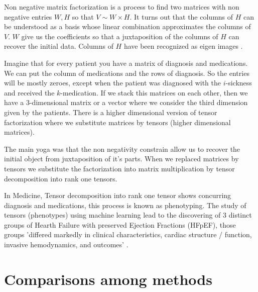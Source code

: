 \documentclass[11pt,letterpaper]{report}
\begin{document}
Non negative matrix factorization is a process to find two matrices with non negative entries $W,H$ so that $V\sim W\times H$. It turns out that the columns of $H$ can be understood as a basis whose linear combination approximates the columns of $V$. $W$ give us the coefficients so that a juxtaposition of the columns of  $H$ can recover the initial data. Columns of $H$ have been recognized as eigen images \cite{Lee1999}.  
 
 

Imagine that for every patient you have a matrix of diagnosis and medications. We can put the column of medications and the rows of diagnosis. So the entries will be mostly zeroes, except when the patient was diagnosed with the $i$-sickness and received the $k$-medication. If we stack this matrices on each other, then we have a 3-dimensional matrix or a vector where we consider the third dimension given by the patients. There is a higher dimensional version of tensor factorization  where we substitute  matrices by tensors (higher dimensional matrices). 
 
The main yoga was that the non negativity constrain allow us to recover the initial object from juxtaposition of it's parts. When we  replaced matrices by tensors we substitute the factorization into matrix multiplication by tensor decomposition into rank one tensors. 
 
 
In Medicine, Tensor decomposition into rank one tensor shows concurring diagnosis and medications, this process is known as phenotyping\cite{Ho}.  The study of tensors (phenotypes) using machine learning lead to the discovering of 3 distinct groups of Hearth Failure with preserved Ejection Fractions (HFpEF), those groups 'differed markedly in clinical characteristics, cardiac structure / function, invasive hemodynamics, and outcomes' \cite{Shah2015}.
 
 

			
		

\section{Comparisons among methods}	
	
	
	
	
	
	
\end{document}
